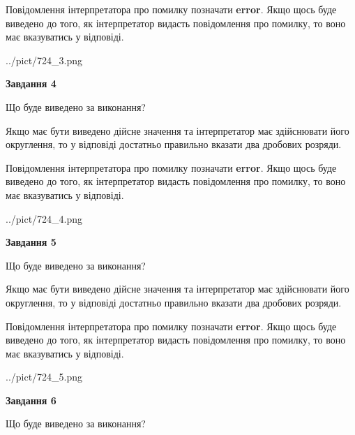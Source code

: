 \documentclass[12pt, ukrainian]{article}
\begin{document}
{\begin {Large}
Повідомлення інтерпретатора про помилку позначати \textbf{error}.
Якщо щось буде виведено до того, як інтерпретатор видасть повідомлення про помилку, 
то воно має вказуватись у відповіді. \par

\begin{center}
	{../pict/724_3.png}
\end{center}
\newpage

{\begin {center}\textbf{Завдання 4}\end {center}}\par
Що буде виведено за виконання? \par

Якщо має бути виведено дійсне значення та інтерпретатор має здійснювати його округлення, 
то у відповіді достатньо правильно вказати два дробових розряди.

Повідомлення інтерпретатора про помилку позначати \textbf{error}.
Якщо щось буде виведено до того, як інтерпретатор видасть повідомлення про помилку, 
то воно має вказуватись у відповіді. \par

\begin{center}
	{../pict/724_4.png}
\end{center}
\newpage

{\begin {center}\textbf{Завдання 5}\end {center}}\par
Що буде виведено за виконання? \par

Якщо має бути виведено дійсне значення та інтерпретатор має здійснювати його округлення, 
то у відповіді достатньо правильно вказати два дробових розряди.

Повідомлення інтерпретатора про помилку позначати \textbf{error}.
Якщо щось буде виведено до того, як інтерпретатор видасть повідомлення про помилку, 
то воно має вказуватись у відповіді. \par

\begin{center}
	{../pict/724_5.png}
\end{center}
\newpage

{\begin {center}\textbf{Завдання 6}\end {center}}\par
Що буде виведено за виконання? \par


\end{Large}}
\end{document}
